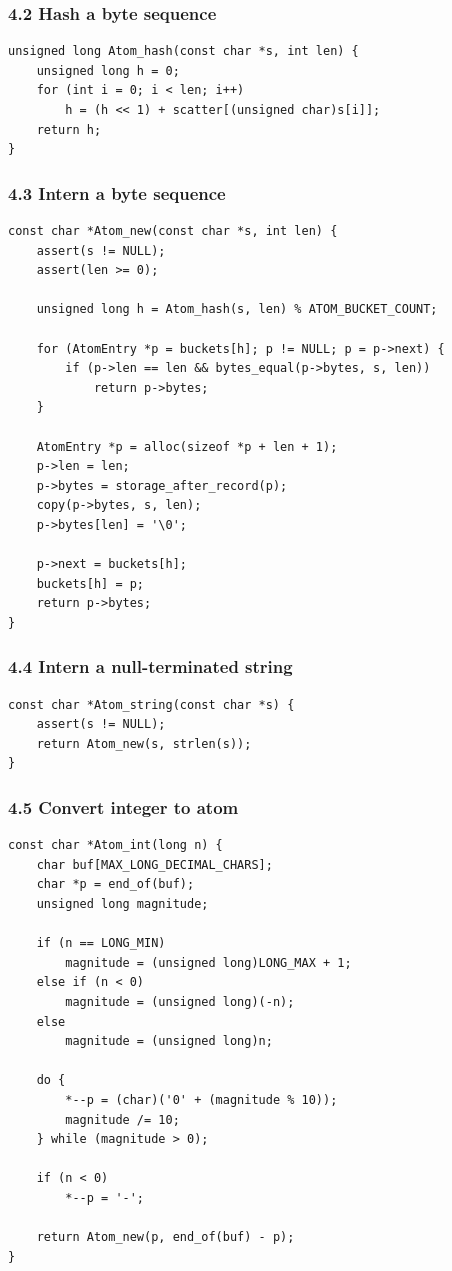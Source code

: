 \documentclass[11pt]{article}
\begin{document}
\subsubsection{4.2 Hash a byte sequence}\label{hash-a-byte-sequence}

\begin{verbatim}
unsigned long Atom_hash(const char *s, int len) {
    unsigned long h = 0;
    for (int i = 0; i < len; i++)
        h = (h << 1) + scatter[(unsigned char)s[i]];
    return h;
}
\end{verbatim}

\subsubsection{4.3 Intern a byte sequence}\label{intern-a-byte-sequence}

\begin{verbatim}
const char *Atom_new(const char *s, int len) {
    assert(s != NULL);
    assert(len >= 0);

    unsigned long h = Atom_hash(s, len) % ATOM_BUCKET_COUNT;

    for (AtomEntry *p = buckets[h]; p != NULL; p = p->next) {
        if (p->len == len && bytes_equal(p->bytes, s, len))
            return p->bytes;
    }

    AtomEntry *p = alloc(sizeof *p + len + 1);
    p->len = len;
    p->bytes = storage_after_record(p);
    copy(p->bytes, s, len);
    p->bytes[len] = '\0';

    p->next = buckets[h];
    buckets[h] = p;
    return p->bytes;
}
\end{verbatim}

\subsubsection{4.4 Intern a null-terminated string}\label{intern-a-null-terminated-string}

\begin{verbatim}
const char *Atom_string(const char *s) {
    assert(s != NULL);
    return Atom_new(s, strlen(s));
}
\end{verbatim}

\subsubsection{4.5 Convert integer to atom}\label{convert-integer-to-atom}

\begin{verbatim}
const char *Atom_int(long n) {
    char buf[MAX_LONG_DECIMAL_CHARS];
    char *p = end_of(buf);
    unsigned long magnitude;

    if (n == LONG_MIN)
        magnitude = (unsigned long)LONG_MAX + 1;
    else if (n < 0)
        magnitude = (unsigned long)(-n);
    else
        magnitude = (unsigned long)n;

    do {
        *--p = (char)('0' + (magnitude % 10));
        magnitude /= 10;
    } while (magnitude > 0);

    if (n < 0)
        *--p = '-';

    return Atom_new(p, end_of(buf) - p);
}
\end{verbatim}
\end{document}

